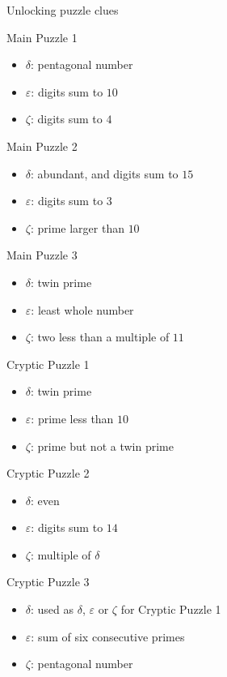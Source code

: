 \documentclass{article}
\newcommand{\clue}[1]{#1}
\begin{document}
\newpage

\clue{
Unlocking puzzle clues

Main Puzzle 1
\begin{itemize}
\item \(\delta\): pentagonal number
\item \(\varepsilon\): digits sum to \(10\)
\item \(\zeta\): digits sum to \(4\)
\end{itemize}

Main Puzzle 2
\begin{itemize}
\item \(\delta\): abundant, and digits sum to \(15\)
\item \(\varepsilon\): digits sum to \(3\)
\item \(\zeta\): prime larger than \(10\)
\end{itemize}

Main Puzzle 3
\begin{itemize}
\item \(\delta\): twin prime
\item \(\varepsilon\): least whole number
\item \(\zeta\): two less than a multiple of \(11\)
\end{itemize}

Cryptic Puzzle 1
\begin{itemize}
\item \(\delta\): twin prime
\item \(\varepsilon\): prime less than \(10\)
\item \(\zeta\): prime but not a twin prime
\end{itemize}

Cryptic Puzzle 2
\begin{itemize}
\item \(\delta\): even
\item \(\varepsilon\): digits sum to \(14\)
\item \(\zeta\): multiple of \(\delta\)
\end{itemize}

Cryptic Puzzle 3
\begin{itemize}
\item \(\delta\): used as \(\delta\), \(\varepsilon\) or \(\zeta\) for Cryptic Puzzle 1
\item \(\varepsilon\): sum of six consecutive primes
\item \(\zeta\): pentagonal number
\end{itemize}
}
\end{document}
